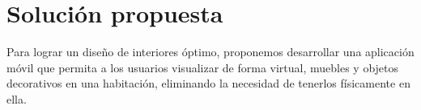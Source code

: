 \section{Solución propuesta}
Para lograr un diseño de interiores óptimo, proponemos desarrollar una aplicación móvil que permita a los usuarios visualizar de forma virtual, muebles y objetos decorativos en una habitación, eliminando la necesidad de tenerlos físicamente en ella.

 